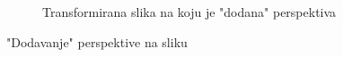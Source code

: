 \begin{figure}[ht]
\begin{subfigure}{0.45\textwidth}
\begin{minipage}{0.9\textwidth}
	\caption{Transformirana slika na koju je "dodana" perspektiva}
	\label{fig:lipsumPerspective}
\end{minipage}
\end{subfigure}
\caption{"Dodavanje" perspektive na sliku}
\label{fig:lipsum}

\end{figure}
